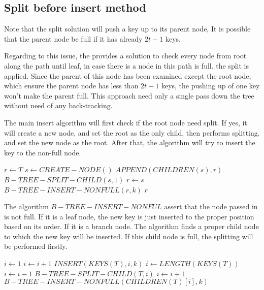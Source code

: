 \documentclass{article}
\begin{document}
\subsection{Split before insert method}
\label{split before insertion}

Note that the split solution will push a key up to its parent node,
It is possible that the parent node be full if it has already 
$2t-1$ keys.

Regarding to this issue, the \cite{CLRS} provides a solution to check 
every node from root along the path until leaf, in case there is a 
node in this path is full. the split is applied. Since the parent
of this node has been examined except the root node, which ensure
the parent node has less than $2t-1$ keys, the pushing up of one
key won't make the parent full. This approach need only a single
pass down the tree without need of any back-tracking.

The main insert algorithm will first check if the root node need
split. If yes, it will create a new node, and set the root as the 
only child, then performs splitting. and set the new node as the
root. After that, the algorithm will try to insert the key to the
non-full node.

\begin{algorithmic}[1]
  \State $r \leftarrow T$
    \State $s \leftarrow CREATE-NODE()$
    \State $APPEND(CHILDREN(s), r)$
    \State $B-TREE-SPLIT-CHILD(s, 1)$
    \State $r \leftarrow s$
  \EndIf
  \State $B-TREE-INSERT-NONFULL(r, k)$
  \State \Return $r$
\EndFunction
\end{algorithmic}

The algorithm $B-TREE-INSERT-NONFUL$ assert that the node passed in
is not full. If it is a leaf node, the new key is just inserted to 
the proper position based on its order. If it is a branch node. The algorithm
finds a proper child node to which the new key will be inserted.
If this child node is full, the splitting will be performed firstly.

\begin{algorithmic}[1]
    \State $i \leftarrow 1$
      \State $i \leftarrow i+1$
    \EndWhile
    \State $INSERT(KEYS(T), i, k)$
  \Else
    \State $i \leftarrow LENGTH(KEYS(T))$
      \State $i \leftarrow i-1$
    \EndWhile
      \State $B-TREE-SPLIT-CHILD(T, i)$
        \State $i \leftarrow i+1$
      \EndIf
    \EndIf
    \State $B-TREE-INSERT-NONFULL(CHILDREN(T)[i], k)$
  \EndIf
\EndProcedure
\end{algorithmic}
\end{document}
